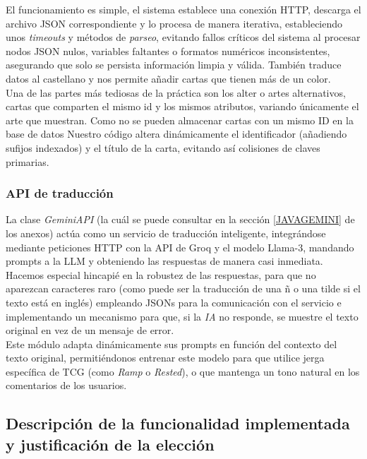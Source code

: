 \documentclass[10pt]{article}
\begin{document}
		El funcionamiento es simple, el sistema establece una conexión HTTP, descarga el archivo JSON correspondiente y lo procesa de manera iterativa, estableciendo unos \textit{timeouts} y métodos de \textit{parseo}, evitando fallos críticos del sistema al procesar nodos JSON nulos, variables faltantes o formatos numéricos inconsistentes, asegurando que solo se persista información limpia y válida. También traduce datos al castellano y nos permite añadir cartas que tienen más de un color.\\
		
		Una de las partes más tediosas de la práctica son los alter o artes alternativos, cartas que comparten el mismo id y los mismos atributos, variando únicamente el arte que muestran. Como no se pueden almacenar cartas con un mismo ID en la base de datos Nuestro código altera dinámicamente el identificador (añadiendo sufijos indexados) y el título de la carta, evitando así colisiones de claves primarias.
	\subsubsection{API de traducción}
		La clase \textit{GeminiAPI} (la cuál se puede consultar en la sección \ref{JAVAGEMINI} de los anexos) actúa como un servicio de traducción inteligente, integrándose mediante peticiones HTTP con la API de Groq y el modelo Llama-3, mandando prompts a la LLM y obteniendo las respuestas de manera casi inmediata. Hacemos especial hincapié en la robustez de las respuestas, para que no aparezcan caracteres raro (como puede ser la traducción de una ñ o una tilde si el texto está en inglés) empleando JSONs para la comunicación con el servicio e implementando un mecanismo para que, si la \textit{IA} no responde, se muestre el texto original en vez de un mensaje de error.\\
		
		Este módulo adapta dinámicamente sus prompts en función del contexto del texto original, permitiéndonos entrenar este modelo para que utilice jerga específica de TCG (como \textit{Ramp} o \textit{Rested}), o que mantenga un tono natural en los comentarios de los usuarios. 
	
	\subsection{Descripción de la funcionalidad implementada y justificación de la elección}
	
	
\end{document}
